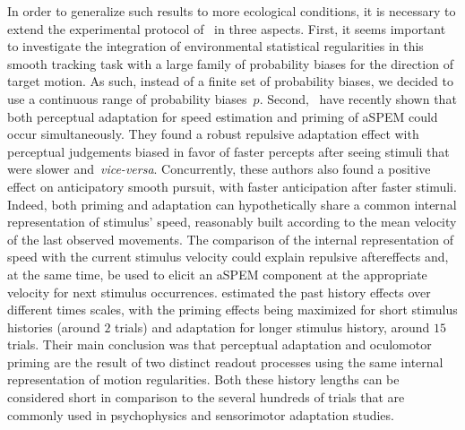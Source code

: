 \documentclass[12pt,english]{article}%
\newcommand{\citet}[1]{\textcite{#1}}
\newcommand{\seeFig}[1]{Figure~\ref{fig:#1}}
\begin{document}
In order to generalize such results to more ecological conditions,
it is necessary to extend the experimental protocol of~\citet{Montagnini2010} in three aspects.
First, it seems important to investigate the integration of environmental statistical regularities
in this smooth tracking task with
a large family of probability biases for the direction of target motion.
As such, instead of a finite set of probability biases, %
we decided to use a continuous range of probability biases~$p$.
Second,~\citet{Maus2015} have recently shown that
both perceptual adaptation for speed estimation
and priming of aSPEM could occur simultaneously.
They found a robust repulsive adaptation effect
with perceptual judgements biased in favor of faster percepts
after seeing stimuli that were slower and~\textit{vice-versa}. 
Concurrently, these authors also found
a positive effect on anticipatory smooth pursuit, 
with faster anticipation after faster stimuli.
Indeed, both priming and adaptation can hypothetically share
a common internal representation of stimulus' speed,
reasonably built according to the mean velocity of the last observed movements.
The comparison of the internal representation of speed
with the current stimulus velocity could explain repulsive aftereffects and,
at the same time, be used to elicit
an aSPEM component at the appropriate velocity
for next stimulus occurrences.
\citet{Maus2015} estimated the past history effects over different times scales,
with the priming effects being maximized
for short stimulus histories (around $2$ trials) and
adaptation for longer stimulus history, around $15$ trials.
Their main conclusion was that
perceptual adaptation and oculomotor priming
are the result of two distinct readout processes 
using the same internal representation of motion regularities.
Both these history lengths can be considered
short in comparison to the several hundreds
of trials that are commonly used in psychophysics and sensorimotor adaptation studies.
\end{document}
